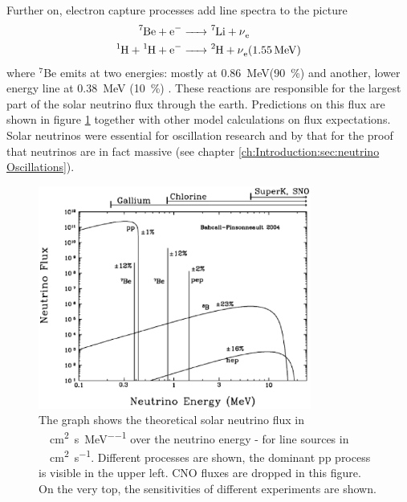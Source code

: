 \begin{itemize}
		Further on, electron capture processes add line spectra to the picture
		\begin{align}
			\label{eq:Berillium}
			\ce{^7Be + e-} & \ce{-> ^7Li + \nu_e}\\
			\ce{^1H + ^1H + e-} & \ce{-> ^2H + \nu_e} (\SI{1.55}{\mega\electronvolt})
		\end{align}
		where $^7$Be emits at two energies: mostly at \SI{0.86}{\mega\electronvolt}(\SI{90}{\percent}) and another, lower energy line at \SI{0.38}{\mega\electronvolt} (\SI{10}{\percent}) \cite{bethgeKernphysik}.
		These reactions are responsible for the largest part of the solar neutrino flux through the earth. Predictions on this flux are shown in figure \ref{fig:neutrinos:solarNeutrinos} together with other model calculations on flux expectations.
		Solar neutrinos were essential for oscillation research and by that for the proof that neutrinos are in fact massive (see chapter \ref{ch:Introduction:sec:neutrino Oscillations}).
		\begin{figure}
		\centering
			\includegraphics[width=0.8\textwidth]{graphics/neutrinos/solarNeutrinos.eps}
			\caption[Solar neutrino Flux]{The graph shows the theoretical solar neutrino flux in \SI{}{\per\square\centi\meter \per\second \per\mega\electronvolt} over the neutrino energy - for line sources in \SI{}{\per\square\centi\meter \per\second}. Different processes are shown, the dominant pp process is visible in the upper left. CNO fluxes are dropped in this figure. On the very top, the sensitivities of different experiments are shown.}
			\label{fig:neutrinos:solarNeutrinos}
		\end{figure}


\end{itemize}
